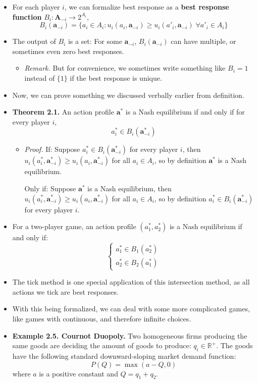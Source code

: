 \documentclass[notitlepage]{article}
\begin{document}
\begin{itemize}
    \item For each player \(i\), we can formalize best response as a \textbf{best response function} \(B_i : \mathbf{A}_{-i} \to 2^{A_i}\),
    \[
    B_i(\mathbf{a}_{-i}) = \{a_i \in A_i: u_i(a_i,\mathbf{a}_{-i}) \ge u_i(a'_i,\mathbf{a}_{-i}) \;\forall a'_i \in A_i\}
    \]
    \item The output of \(B_i\) is a set: For some \(\mathbf{a}_{-i}\), \(B_i(\mathbf{a}_{-i})\) can have multiple, or sometimes even zero best responses.
    \begin{itemize}
        \item \textit{Remark.} But for convenience, we sometimes write something like \(B_i = 1\) instead of \(\{1\}\) if the best response is unique.
    \end{itemize}
    \item Now, we can prove something we discussed verbally earlier from definition.
    \item \textbf{Theorem 2.1.} An action profile \(\mathbf{a}^*\) is a Nash equilibrium if and only if for every player \(i\),
    \[
    a^*_i \in B_i(\mathbf{a}^*_{-i})
    \]
    \begin{itemize}
        \item \textit{Proof.} If: Suppose \(a^*_i \in B_i(\mathbf{a}^*_{-i})\) for every player \(i\), then \(u_i(a_i^*,\mathbf{a}_{-i}^*) \ge u_i(a_i,\mathbf{a}_{-i}^*)\) for all \(a_i \in A_i\), so by definition \(\mathbf{a}^*\) is a Nash equilibrium.

        Only if: Suppose \(\mathbf{a}^*\) is a Nash equilibrium, then \(u_i(a_i^*,\mathbf{a}_{-i}^*) \ge u_i(a_i,\mathbf{a}_{-i}^*)\) for all \(a_i \in A_i\), so by definition \(a^*_i \in B_i(\mathbf{a}^*_{-i})\) for every player \(i\).
    \end{itemize}
    \item For a two-player game, an action profile \((a_1^*, a_2^*)\) is a Nash equilibrium if and only if:
    \[
    \begin{cases}
        a_1^* \in B_1(a_2^*) \\
        a_2^* \in B_2(a_1^*)
    \end{cases}
    \]
    \item The tick method is one special application of this intersection method, as all actions we tick are best responses.
    \item With this being formalized, we can deal with some more complicated games, like games with continuous, and therefore infinite choices.
    \item \textbf{Example 2.5. Cournot Duopoly.} Two homogeneous firms producing the same goods are deciding the amount of goods to produce: \(q_i \in \mathbb{R}^+\). The goods have the following standard downward-sloping market demand function:
    \[
    P(Q) = \max(a-Q,0)
    \]
    where \(a\) is a positive constant and \(Q = q_1 + q_2\).


\end{itemize}
\end{document}
